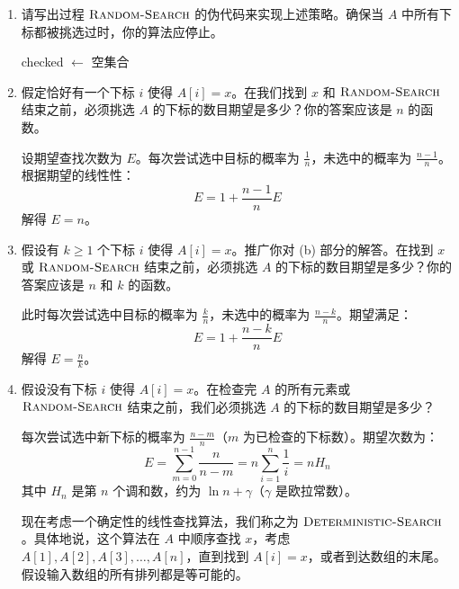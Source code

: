 \documentclass[UTF8]{ctexart}
\begin{document}
		\begin{enumerate}[label=\alph*.]
			\item 请写出过程 $\textsc{Random-Search}$ 的伪代码来实现上述策略。确保当 $A$ 中所有下标都被挑选过时，你的算法应停止。
			
			\begin{algorithm}[H]
				\SetAlgoLined
				checked $\leftarrow$ 空集合\;
				\caption{$\textsc{Random-Search}(A, x)$}
			\end{algorithm}
			
			\item 假定恰好有一个下标 $i$ 使得 $A[i] = x$。在我们找到 $x$ 和 $\textsc{Random-Search}$ 结束之前，必须挑选 $A$ 的下标的数目期望是多少？你的答案应该是 $n$ 的函数。
			
			设期望查找次数为 $E$。每次尝试选中目标的概率为 $\frac{1}{n}$，未选中的概率为 $\frac{n-1}{n}$。根据期望的线性性：
			\[
			E = 1 + \frac{n-1}{n}E
			\]
			解得 $E = n$。
			
			\item 假设有 $k \geq 1$ 个下标 $i$ 使得 $A[i] = x$。推广你对 (b) 部分的解答。在找到 $x$ 或 $\textsc{Random-Search}$ 结束之前，必须挑选 $A$ 的下标的数目期望是多少？你的答案应该是 $n$ 和 $k$ 的函数。
			
			此时每次尝试选中目标的概率为 $\frac{k}{n}$，未选中的概率为 $\frac{n-k}{n}$。期望满足：
			\[
			E = 1 + \frac{n-k}{n}E
			\]
			解得 $E = \frac{n}{k}$。
			
			\item 假设没有下标 $i$ 使得 $A[i] = x$。在检查完 $A$ 的所有元素或 $\textsc{Random-Search}$ 结束之前，我们必须挑选 $A$ 的下标的数目期望是多少？
			
			每次尝试选中新下标的概率为 $\frac{n-m}{n}$（$m$ 为已检查的下标数）。期望次数为：
			\[
			E = \sum_{m=0}^{n-1} \frac{n}{n-m} = n \sum_{i=1}^n \frac{1}{i} = n H_n
			\]
			其中 $H_n$ 是第 $n$ 个调和数，约为 $\ln n + \gamma$（$\gamma$ 是欧拉常数）。
			
			现在考虑一个确定性的线性查找算法，我们称之为 $\textsc{Deterministic-Search}$。具体地说，这个算法在 $A$ 中顺序查找 $x$，考虑 $A[1], A[2], A[3], \dots, A[n]$，直到找到 $A[i] = x$，或者到达数组的末尾。假设输入数组的所有排列都是等可能的。
			

\end{enumerate}
\end{document}

